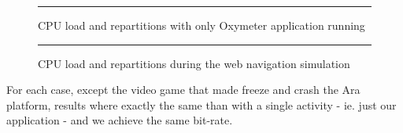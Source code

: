 \begin{figure}[htbp]
    \label{fig:cpu-single}
    \rule{35em}{0.5pt}
    \caption[CPU load and repartitions with only Oxymeter application running]{CPU load and repartitions with only Oxymeter application running}
\end{figure}


\begin{figure}[htbp]
    \label{fig:cpu-load}
    \rule{35em}{0.5pt}
    \caption[CPU load and repartitions during the web navigation simulation]{CPU load and repartitions during the web navigation simulation}
\end{figure}

For each case, except the video game that made freeze and crash the Ara platform, results where exactly the same than with a single activity - ie. just our application - and we achieve the same bit-rate.

